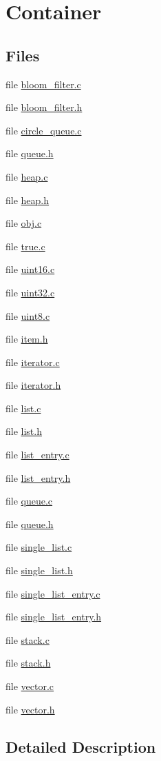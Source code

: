 \hypertarget{group__container}{\section{Container}
\label{group__container}
}
\subsection*{Files}
\begin{DoxyCompactItemize}
\item 
file \hyperlink{bloom__filter_8c}{bloom\-\_\-filter.\-c}
\item 
file \hyperlink{bloom__filter_8h}{bloom\-\_\-filter.\-h}
\item 
file \hyperlink{circle__queue_8c}{circle\-\_\-queue.\-c}
\item 
file \hyperlink{queue_8h}{queue.\-h}
\item 
file \hyperlink{heap_8c}{heap.\-c}
\item 
file \hyperlink{heap_8h}{heap.\-h}
\item 
file \hyperlink{obj_8c}{obj.\-c}
\item 
file \hyperlink{true_8c}{true.\-c}
\item 
file \hyperlink{uint16_8c}{uint16.\-c}
\item 
file \hyperlink{uint32_8c}{uint32.\-c}
\item 
file \hyperlink{uint8_8c}{uint8.\-c}
\item 
file \hyperlink{item_8h}{item.\-h}
\item 
file \hyperlink{iterator_8c}{iterator.\-c}
\item 
file \hyperlink{iterator_8h}{iterator.\-h}
\item 
file \hyperlink{list_8c}{list.\-c}
\item 
file \hyperlink{list_8h}{list.\-h}
\item 
file \hyperlink{list__entry_8c}{list\-\_\-entry.\-c}
\item 
file \hyperlink{list__entry_8h}{list\-\_\-entry.\-h}
\item 
file \hyperlink{queue_8c}{queue.\-c}
\item 
file \hyperlink{queue_8h}{queue.\-h}
\item 
file \hyperlink{single__list_8c}{single\-\_\-list.\-c}
\item 
file \hyperlink{single__list_8h}{single\-\_\-list.\-h}
\item 
file \hyperlink{single__list__entry_8c}{single\-\_\-list\-\_\-entry.\-c}
\item 
file \hyperlink{single__list__entry_8h}{single\-\_\-list\-\_\-entry.\-h}
\item 
file \hyperlink{stack_8c}{stack.\-c}
\item 
file \hyperlink{stack_8h}{stack.\-h}
\item 
file \hyperlink{vector_8c}{vector.\-c}
\item 
file \hyperlink{vector_8h}{vector.\-h}
\end{DoxyCompactItemize}


\subsection{Detailed Description}
